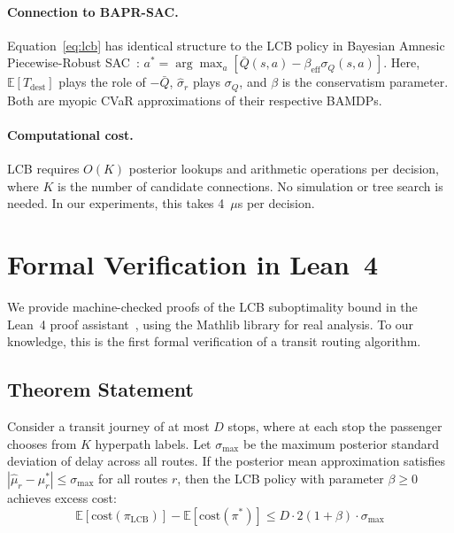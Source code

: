 \documentclass[journal]{IEEEtran}
\begin{document}
\paragraph{Connection to BAPR-SAC.} Equation~\eqref{eq:lcb} has identical structure to the LCB policy in Bayesian Amnesic Piecewise-Robust SAC~\cite{bapr2024}: $a^* = \arg\max_a [\bar{Q}(s,a) - \beta_{\text{eff}} \sigma_Q(s,a)]$. Here, $\mathbb{E}[T_{\mathrm{dest}}]$ plays the role of $-\bar{Q}$, $\hat{\sigma}_r$ plays $\sigma_Q$, and $\beta$ is the conservatism parameter. Both are myopic CVaR approximations of their respective BAMDPs.

\paragraph{Computational cost.} LCB requires $O(K)$ posterior lookups and arithmetic operations per decision, where $K$ is the number of candidate connections. No simulation or tree search is needed. In our experiments, this takes 4~$\mu$s per decision.

\section{Formal Verification in Lean~4}
\label{sec:lean}

We provide machine-checked proofs of the LCB suboptimality bound in the Lean~4 proof assistant~\cite{lean4}, using the Mathlib library for real analysis. To our knowledge, this is the first formal verification of a transit routing algorithm.

\subsection{Theorem Statement}

\begin{theorem}
\label{thm:lcb}
Consider a transit journey of at most $D$ stops, where at each stop the passenger chooses from $K$ hyperpath labels. Let $\sigma_{\max}$ be the maximum posterior standard deviation of delay across all routes. If the posterior mean approximation satisfies $|\hat{\mu}_r - \mu_r^*| \leq \sigma_{\max}$ for all routes $r$, then the LCB policy with parameter $\beta \geq 0$ achieves excess cost:
\begin{equation}
    \mathbb{E}[\mathrm{cost}(\pi_{\mathrm{LCB}})] - \mathbb{E}[\mathrm{cost}(\pi^*)] \leq D \cdot 2(1 + \beta) \cdot \sigma_{\max}
    \label{eq:main_bound}
\end{equation}
\end{theorem}
\end{document}
